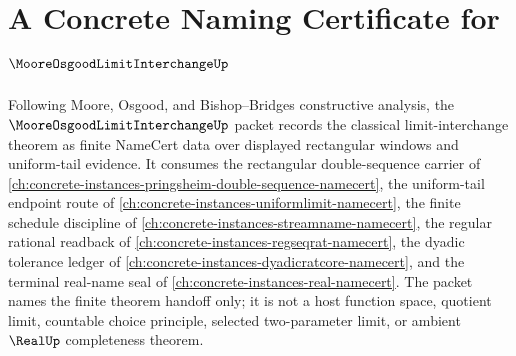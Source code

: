\chapter{A Concrete Naming Certificate for $\MooreOsgoodLimitInterchangeUp$}
\label{ch:concrete-instances-moore-osgood-limit-interchange-namecert}

Following Moore, Osgood, and Bishop--Bridges constructive analysis, the $\MooreOsgoodLimitInterchangeUp$ packet records the classical limit-interchange theorem as finite NameCert data over displayed rectangular windows and uniform-tail evidence. It consumes the rectangular double-sequence carrier of \autoref{ch:concrete-instances-pringsheim-double-sequence-namecert}, the uniform-tail endpoint route of \autoref{ch:concrete-instances-uniformlimit-namecert}, the finite schedule discipline of \autoref{ch:concrete-instances-streamname-namecert}, the regular rational readback of \autoref{ch:concrete-instances-regseqrat-namecert}, the dyadic tolerance ledger of \autoref{ch:concrete-instances-dyadicratcore-namecert}, and the terminal real-name seal of \autoref{ch:concrete-instances-real-namecert}. The packet names the finite theorem handoff only; it is not a host function space, quotient limit, countable choice principle, selected two-parameter limit, or ambient $\RealUp$ completeness theorem.

